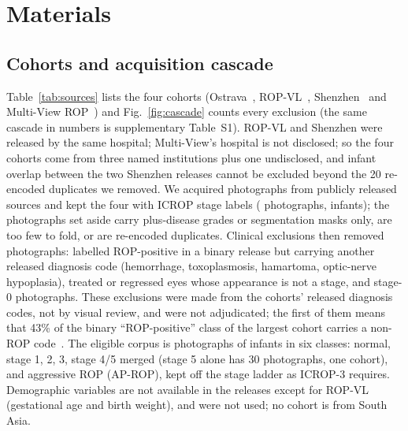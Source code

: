 \documentclass[journal]{IEEEtran}
\begin{document}
\section{Materials}\label{sec:data}
\subsection{Cohorts and acquisition cascade}
Table~\ref{tab:sources} lists the four cohorts (Ostrava~\cite{timkovic2024}, ROP-VL~\cite{ropvl2026}, Shenzhen~\cite{zhao2024} and Multi-View ROP~\cite{multiview2026}) and Fig.~\ref{fig:cascade} counts every exclusion (the same cascade in numbers is supplementary Table~S1). ROP-VL and Shenzhen were released by the same hospital; Multi-View's hospital is not disclosed; so the four cohorts come from three named institutions plus one undisclosed, and infant overlap between the two Shenzhen releases cannot be excluded beyond the 20 re-encoded duplicates we removed. We acquired \acqImages{} photographs from \acqSources{} publicly released sources and kept the four with ICROP stage labels (\stageLabelled{} photographs, \stageInfants{} infants); the \acqExcluded{} photographs set aside carry plus-disease grades or segmentation masks only, are too few to fold, or are re-encoded duplicates. Clinical exclusions then removed \exclSix{} photographs: \exclOther{} labelled ROP-positive in a binary release but carrying another released diagnosis code (hemorrhage, toxoplasmosis, hamartoma, optic-nerve hypoplasia), \exclTreated{} treated or regressed eyes whose appearance is not a stage, and \exclStageZero{} stage-0 photographs. These exclusions were made from the cohorts' released diagnosis codes, not by visual review, and were not adjudicated; the first of them means that 43\% of the binary ``ROP-positive'' class of the largest cohort carries a non-ROP code~\cite{nagpure2026}. The eligible corpus is \sixElig{} photographs of \sixInfants{} infants in six classes: normal, stage 1, 2, 3, stage 4/5 merged (stage 5 alone has 30 photographs, one cohort), and aggressive ROP (AP-ROP), kept off the stage ladder as ICROP-3 requires. Demographic variables are not available in the releases except for ROP-VL (gestational age and birth weight), and were not used; no cohort is from South Asia.

\begin{table}[!t]
\caption{The four cohorts. Native size from the released files; Ostrava's three sizes map one-to-one onto its three cameras. Label unit: what one released label describes. Photos and infants: as acquired, before exclusions. Use: after exclusions (CV = cross-validation; dev and locked = the two halves of the held-out cohort). Grader numbers and grading protocols are not stated in the releases.}
\label{tab:sources}
\centering\scriptsize\setlength{\tabcolsep}{4pt}

\end{table}
\end{document}
